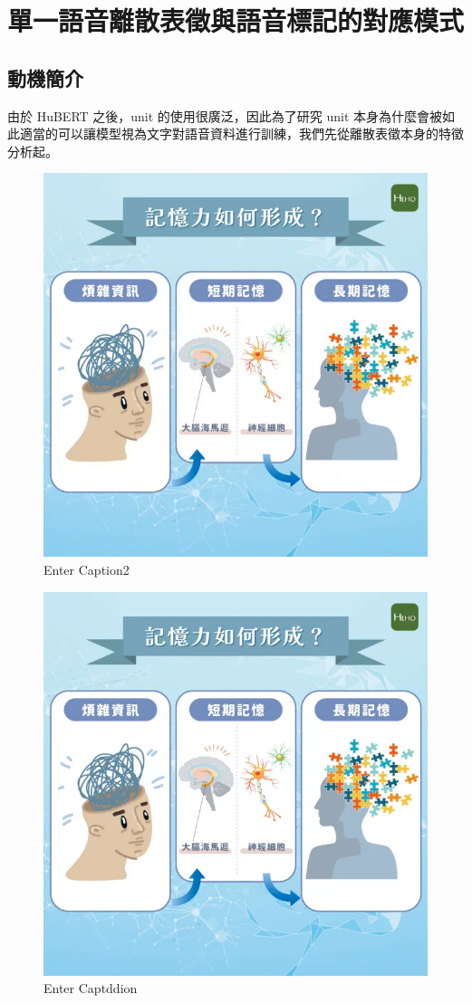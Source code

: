 
\chapter{
單一語音離散表徵與語音標記的對應模式}
\section{動機簡介}  %
由於 HuBERT 之後，unit 的使用很廣泛，因此為了研究 unit 本身為什麼會被如此適當的可以讓模型視為文字對語音資料進行訓練，我們先從離散表徵本身的特徵分析起。 



\begin{figure}
    \centering
    \includegraphics[width=0.5\linewidth,natwidth=600,natheight=600]{figures/3ac2dbd72f1431bb1ffde8fc28724640.webp}
    \caption{Enter Caption2}
    \label{fig:enter-label2}
\end{figure}

\begin{figure}
    \centering
    \includegraphics[width=0.5\linewidth]{figures/3ac2dbd72f1431bb1ffde8fc28724640.png}
    \caption{Enter Captddion}
    \label{fig:enter-labddel}
\end{figure}

